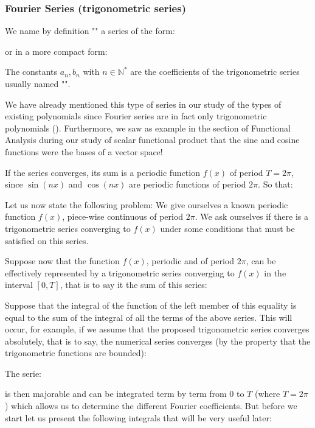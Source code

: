 	\subsubsection{Fourier Series (trigonometric series)}\label{fourier series}
	We name by definition "" a series of the form:
	
	or in a more compact form:
	
	The constants $a_n,b_n$ with $n\in \mathbb{N}^{*}$ are the coefficients of the trigonometric series usually named "".
	
	\begin{tcolorbox}[title=Remark,colframe=black,arc=10pt]
	We have already mentioned this type of series in our study of the types of existing polynomials since Fourier series are in fact only trigonometric polynomials (). Furthermore, we saw as example in the section of Functional Analysis during our study of scalar functional product that the sine and cosine functions were the bases of a vector space!
	\end{tcolorbox}
	If the series converges, its sum is a periodic function $f (x)$ of period $T=2\pi$, since $\sin (nx)$ and $\cos (nx)$ are periodic functions of period $2\pi$. So that:
	
	Let us now state the following problem: We give ourselves a known periodic function $f(x)$, piece-wise continuous of period $2\pi$. We ask ourselves if there is a trigonometric series converging to $f (x)$ under some conditions that must be satisfied on this series.
	
	Suppose now that the function $f (x)$, periodic and of period $2\pi$, can be effectively represented by a trigonometric series converging to $f (x)$ in the interval $[0, T]$, that is to say it the sum of this series:
	
	Suppose that the integral of the function of the left member of this equality is equal to the sum of the integral of all the terms of the above series. This will occur, for example, if we assume that the proposed trigonometric series converges absolutely, that is to say, the numerical series converges (by the property that the trigonometric functions are bounded):
	
	The serie:
	
	is then majorable and can be integrated term by term from $0$ to $T$ (where $T=2\pi$) which allows us to determine the different Fourier coefficients. But before we start let us present the following integrals that will be very useful later:
	
